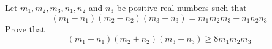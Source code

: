 Let $m_1,m_2,m_3,n_1,n_2$ and $n_3$ be positive real numbers such that\[(m_1-n_1)(m_2-n_2)(m_3-n_3)=m_1m_2m_3-n_1n_2n_3\]Prove that\[(m_1+n_1)(m_2+n_2)(m_3+n_3)\geq8m_1m_2m_3\]
